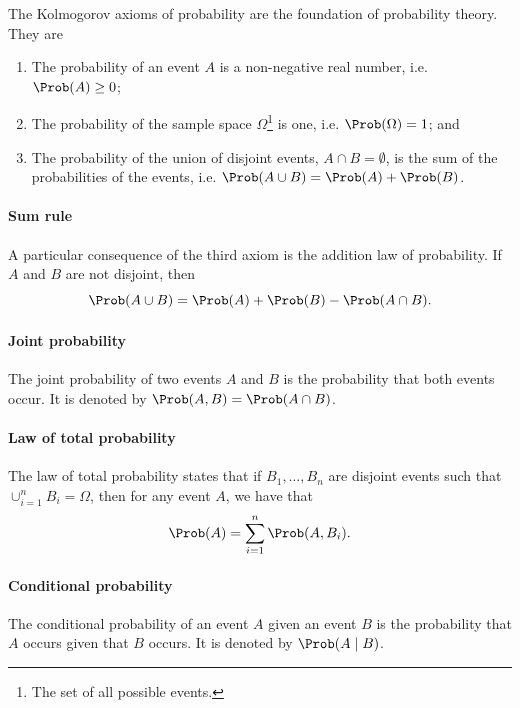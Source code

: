The Kolmogorov axioms of probability are the foundation of probability theory.
They are
\begin{enumerate}
  \item The probability of an event $A$ is a non-negative real number, i.e. $\Prob(A) \geq 0$;
  \item The probability of the sample space $\Omega$\footnote{The set of all possible
    events.} is one, i.e. $\Prob(\Omega) = 1$; and
  \item The probability of the union of disjoint events, $A \cap B = \emptyset$, is
    the sum of the probabilities of the events, i.e. $\Prob(A \cup B) = \Prob(A) + \Prob(B)$.
\end{enumerate}

\paragraph{Sum rule}
A particular consequence of the third axiom is the addition law of probability.
If $A$ and $B$ are not disjoint, then
\begin{equation*}
  \Prob(A \cup B) = \Prob(A) + \Prob(B) - \Prob(A \cap B)\text{.}
\end{equation*}

\paragraph{Joint probability}

The joint probability of two events $A$ and $B$ is the probability that both events
occur.  It is denoted by $\Prob(A, B) = \Prob(A \cap B)$.

\paragraph{Law of total probability}

The law of total probability states that if $B_1, \dots, B_n$ are disjoint events
such that $\cup_{i = 1}^n B_i = \Omega$, then for any event $A$, we have that
$$\Prob(A) = \sum_{i = 1}^n \Prob(A, B_i)\text{.}$$

\paragraph{Conditional probability}

The conditional probability of an event $A$ given an event $B$ is the probability
that $A$ occurs given that $B$ occurs.  It is denoted by $\Prob(A \mid B)$.

